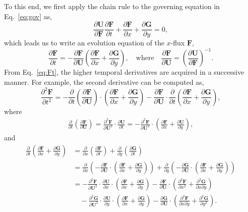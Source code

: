 \documentclass[times,preprint,3p]{elsarticle}
\newcommand{\pd}[2]{\frac{\partial #1}{\partial #2}}
\newcommand{\pdd}[2]{\frac{\partial^{2} #1}{\partial #2^{2}}}
\newcommand{\bF}{\mathbf{F}}
\newcommand{\bG}{\mathbf{G}}
\newcommand{\bU}{\mathbf{U}}
\begin{document}
%
To this end, we first apply the chain rule to the governing
equation in Eq.~\eqref{eq:gov} as,
\begin{equation}\label{eq:chain-rule}
    \pd{\bU}{\bF}\pd{\bF}{t} + \pd{\bF}{x} + \pd{\bG}{y} = 0,
\end{equation}
which leads us to write an evolution equation of the $x$-flux $\bF$,
\begin{equation}\label{eq:Ft}
    \pd{\bF}{t} = -\pd{\bF}{\bU} \left( \pd{\bF}{x} + \pd{\bG}{y} \right), \quad
    \mbox{where} \quad \pd{\bF}{\bU} = \left( \pd{\bU}{\bF}\right)^{-1}.
\end{equation}
%
From Eq.~\eqref{eq:Ft}, the higher temporal derivatives are acquired
in a successive manner. For example, the second derivative can be computed as,
\begin{equation}\label{eq:Ftt}
    \pdd{\bF}{t} = - \pd{}{t} \left( \pd{\bF}{\bU} \right) \cdot \left( \pd{\bF}{x} + \pd{\bG}{y} \right)
    - \pd{\bF}{\bU} \cdot \pd{}{t} \left( \pd{\bF}{x} + \pd{\bG}{y} \right),
\end{equation}
where
\begin{equation}\label{eq:Jt}
    \begin{split}
        \pd{}{t} \left( \pd{\bF}{\bU} \right) = \pdd{\bF}{\bU} \cdot \pd{\bU}{t}
         = -\pdd{\bF}{\bU} \cdot \left( \pd{\bF}{x} + \pd{\bU}{y} \right),
    \end{split}
\end{equation}
and
\begin{equation}\label{eq:divt}
    \begin{split}
        \pd{}{t} \left( \pd{\bF}{x} + \pd{\bG}{y} \right) &= \pd{}{x} \left( \pd{\bF}{t} \right) +
        \pd{}{y} \left( \pd{\bG}{t} \right) \\
        & = \pd{}{x} \left( -\pd{\bF}{\bU} \cdot \left( \pd{\bF}{x} + \pd{\bG}{y} \right) \right) +
        \pd{}{y} \left( -\pd{\bG}{\bU} \cdot \left( \pd{\bF}{x} + \pd{\bG}{y} \right) \right) \\
        & = -\pdd{\bF}{\bU} \cdot \pd{\bU}{x} \cdot \left( \pd{\bF}{x} + \pd{\bG}{y} \right) -
        \pd{\bF}{\bU} \cdot \left( \pdd{\bF}{x} + \frac{\partial^{2} \bG}{\partial x \partial y} \right) \\
        &\quad -\pdd{\bG}{\bU} \cdot \pd{\bU}{y} \cdot \left( \pd{\bF}{x} + \pd{\bG}{y} \right) -
        \pd{\bG}{\bU} \cdot \left( \frac{\partial^{2} \bF}{\partial x \partial y} + \pdd{\bG}{y} \right).
    \end{split}
\end{equation}
\end{document}
